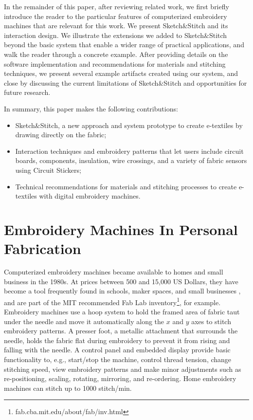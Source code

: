 \documentclass[header.tex]{subfiles}
\begin{document}
In the remainder of this paper, after reviewing related work, we first briefly introduce the reader to the particular features of computerized embroidery machines that are relevant for this work. We present Sketch\&Stitch and its interaction design. We illustrate the extensions we added to Sketch\&Stitch beyond the basic system that enable a wider range of practical applications, and walk the reader through a concrete example. After providing details on the software implementation and recommendations for materials and stitching techniques, we present several example artifacts created using our system, and close by discussing the current limitations of Sketch\&Stitch and opportunities for future research.

In summary, this paper makes the following contributions:
\begin{itemize}
    \item Sketch\&Stitch, a new approach and system prototype to create e-textiles by drawing directly on the fabric;
    \item Interaction techniques and embroidery patterns that let users include circuit boards, components, insulation, wire crossings, and a variety of fabric sensors using Circuit Stickers;
    \item Technical recommendations for materials and stitching processes to create e-textiles with digital embroidery machines.
\end{itemize}








\section{Embroidery Machines In Personal Fabrication}
Computerized embroidery machines became available to homes and small business in the 1980s. At prices between 500 and 15,000 US Dollars, they have become a tool frequently found in schools, maker spaces, and small businesses \cite{lipson2010factory}, and are part of the MIT recommended Fab Lab inventory\footnote{fab.cba.mit.edu/about/fab/inv.html}, for example.
Embroidery machines use a hoop system to hold the framed area of fabric taut under the needle and move it automatically along the $x$ and $y$ axes to stitch embroidery patterns. A presser foot, a metallic attachment that surrounds the needle, holds the fabric flat during embroidery to prevent it from rising and falling with the needle. A control panel and embedded display provide basic functionality to, e.g., start/stop the machine, control thread tension, change stitching speed, view embroidery patterns and make minor adjustments such as re-positioning, scaling, rotating, mirroring, and re-ordering. Home embroidery machines can stitch up to 1000 stitch/min.
\end{document}
